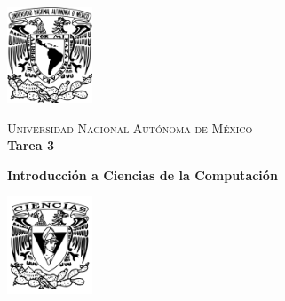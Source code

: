 \documentclass{report}
\begin{document}
    \begin{minipage}[t]{0.165 \textwidth}
       \begin{flushright}
        \includegraphics[width=1in]{EscudoUNAM.png}
       \end{flushright}
    \end{minipage}
    \begin{minipage}[H]{0.62 \textwidth}
        \begin{center}
            {\large \textsc{Universidad Nacional Autónoma de México}}
            \vspace{0.25cm}
            \\
            { \huge \textbf{Tarea 3}}
            \\
            \vspace{0.25cm}
            
            \textbf{Introducción a Ciencias de la Computación}
	    \\
	    \vspace{0.25cm}
            \vspace{0.2cm}
        \end{center}
        \vspace{0.05cm}
    \end{minipage}
    \begin{minipage}[t]{0.165 \textwidth}
        \begin{flushleft}
            \includegraphics[width=1in]{Fciencias_UNAM.png}
        \end{flushleft}
    \end{minipage}

\end{document}
